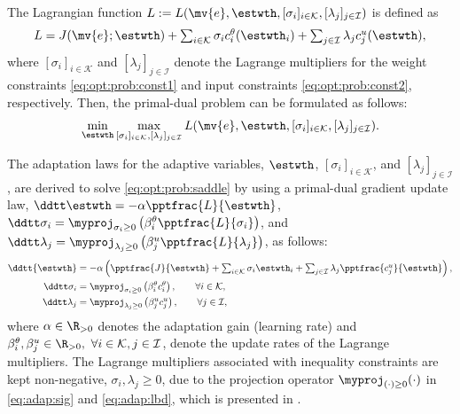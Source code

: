 \documentclass[letterpaper, journal]{IEEEtran}
\begin{document}
The Lagrangian function $L:=L(\mv{e},\estwth,[\sigma_i]_{i\in\mathcal{K}},[\lambda_j]_{j\in\mathcal I})$ is defined as
\begin{equation}
  L
  = 
  J(\mv{e};\estwth) 
  + 
  \textstyle\sum_{i\in\mathcal{K}}
  \sigma_{i}
  c^{\theta}_{i}(\estwth_i)
  +
  \textstyle\sum_{j\in\mathcal I}
  \lambda_{j}
  c^{u}_{j}(\estwth)
  ,
  \label{eq:lagrangian}
\end{equation}
where $[\sigma_i]_{i\in\mathcal{K}}$ and $[\lambda_j]_{j\in\mathcal{I}}$ denote the Lagrange multipliers for the weight constraints \eqref{eq:opt:prob:const1} and input constraints \eqref{eq:opt:prob:const2}, respectively.
Then, the primal-dual problem can be formulated as follows:
\begin{equation} \label{eq:opt:prob:saddle}
  \min_{\estwth}
  \max_{
    [\sigma_i]_{i\in\mathcal{K}}
    ,
    [\lambda_j]_{j\in\mathcal{I}}
  } 
  L(\mv{e},\estwth,[\sigma_i]_{i\in\mathcal{K}},[\lambda_j]_{j\in\mathcal I})
  .
\end{equation}

The adaptation laws for the adaptive variables, $\estwth$, $[\sigma_i]_{i\in\mathcal{K}}$, and $[\lambda_j]_{j\in\mathcal{I}}$, are derived to solve \eqref{eq:opt:prob:saddle} by using a primal-dual gradient update law, \ie 
$
  \ddtt\estwth 
  = 
  -\alpha \pptfrac{L}{\estwth}
$, $
  \ddtt\sigma_i 
  = 
  \myproj_{\sigma_i\ge0}
  \left(
      \beta_i^\theta 
      \pptfrac{L}{\sigma_i}
  \right)
$, and $
  \ddtt\lambda_j 
  = 
  \myproj_{\lambda_j\ge0}
  \left(
    \beta_j^u 
    \pptfrac{L}{\lambda_j}
  \right)
$, as follows:
\begin{subequations} \label{eq:adap}
  \begin{align}
    \ddtt{\estwth}
    &
    =
    -\alpha 
    \left(
      \pptfrac{J}{\estwth}
      +
      \textstyle\sum_{i\in\mathcal{K}}
      \sigma_i 
      \estwth_i
      +
      \textstyle\sum_{j\in\mathcal{I}}
      \lambda_j 
      \pptfrac{c^{u}_{j}}{\estwth}
    \right),
    \label{eq:adap:th}
    \\
    \ddtt\sigma_i
    & 
    = 
    \myproj_{\sigma_i\ge0}
      \left(
      \beta_i^{\theta}
      c^{\theta}_{i} 
    \right)
    ,
    \qquad \forall i\in\mathcal{K},
    \label{eq:adap:sig}
    \\
    \ddtt\lambda_j
    & 
    = 
    \myproj_{\lambda_j\ge0}
      \left(
      \beta_j^{u}
      c^{u}_{j} 
    \right)
    ,
    \qquad \forall j\in\mathcal{I},
    \label{eq:adap:lbd}
  \end{align}%
\end{subequations}
where $\alpha\in\R_{>0}$ denotes the adaptation gain (learning rate) and $\beta_i^{\theta},\beta_j^{u}\in\R_{>0},\ \forall i\in\mathcal{K},j\in\mathcal{I}$, denote the update rates of the Lagrange multipliers. 
The Lagrange multipliers associated with inequality constraints are kept non-negative, \ie $\sigma_i,\lambda_j\ge 0$, due to the projection operator $\myproj_{(\cdot)\ge0}(\cdot)$ in \eqref{eq:adap:sig} and \eqref{eq:adap:lbd}, which is presented in \cite[Appendix E, eq. (E.4)]{Krstic:1995aa}.
\end{document}

